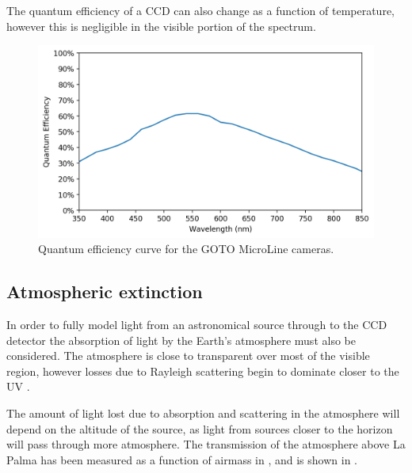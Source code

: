 \begin{colsection}
\begin{colsection}
The quantum efficiency of a CCD can also change as a function of temperature, however this is negligible in the visible portion of the spectrum.

\begin{figure}[t]
    \begin{center}
        \includegraphics[width=\textwidth]{images/throughput/qe.png}
    \end{center}
    \caption[MicroLine quantum efficiency curve]{
        Quantum efficiency curve for the GOTO MicroLine cameras.
    }\label{fig:qe}
\end{figure}

\end{colsection}

\newpage
\subsection{Atmospheric extinction}
\label{sec:atmosphere}
\begin{colsection}

In order to fully model light from an astronomical source through to the CCD detector the absorption of light by the Earth's atmosphere must also be considered. The atmosphere is close to transparent over most of the visible region, however losses due to Rayleigh scattering begin to dominate closer to the UV \citep{atmosphere}.

The amount of light lost due to absorption and scattering in the atmosphere will depend on the altitude of the source, as light from sources closer to the horizon will pass through more atmosphere. The transmission of the atmosphere above La Palma has been measured as a function of airmass in \citet{tn31}, and is shown in .


\end{colsection}
\end{colsection}
